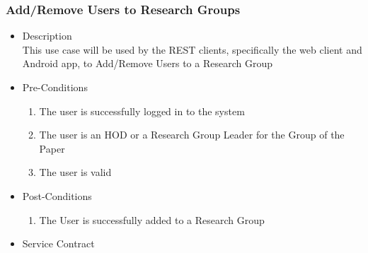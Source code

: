\documentclass[a4paper,10pt]{article}
\begin{document}
\subsubsection{Add/Remove Users to Research Groups}
	\begin{itemize}
		\item Description\\
			This use case will be used by the REST clients, specifically the web client and Android app, to Add/Remove Users to a  Research Group
		\item Pre-Conditions
			\begin{enumerate}
				\item The user is successfully logged in to the system
				\item The user is an HOD or a Research Group Leader for the Group of the Paper
				\item The user is valid
			\end{enumerate}
		\item Post-Conditions
			\begin{enumerate}
				\item The User is successfully added to a Research Group
						
			\end{enumerate}
		\item Service Contract
	\end{itemize}
\end{document}
